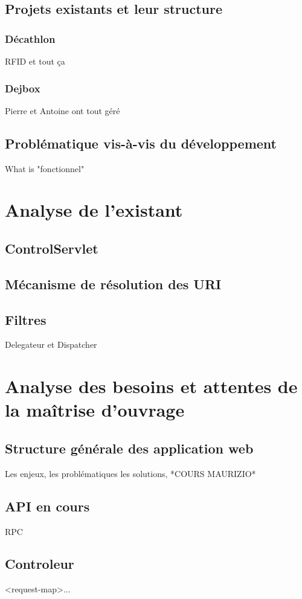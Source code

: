 \subsection{Projets existants et leur structure}
\subsubsection{Décathlon}
RFID et tout ça
\subsubsection{Dejbox}
Pierre et Antoine ont tout géré 

\subsection{Problématique vis-à-vis du développement}
What is "fonctionnel"

\newpage

\section{Analyse de l'existant}
\subsection{ControlServlet}
\subsection{Mécanisme de résolution des URI}
\subsection{Filtres}
Delegateur et Dispatcher


\newpage

\section{Analyse des besoins et attentes de la maîtrise d'ouvrage}
\subsection{Structure générale des application web}
Les enjeux, les problématiques les solutions, *COURS MAURIZIO*
\subsection{API en cours}
RPC
\subsection{Controleur}
<request-map>...
